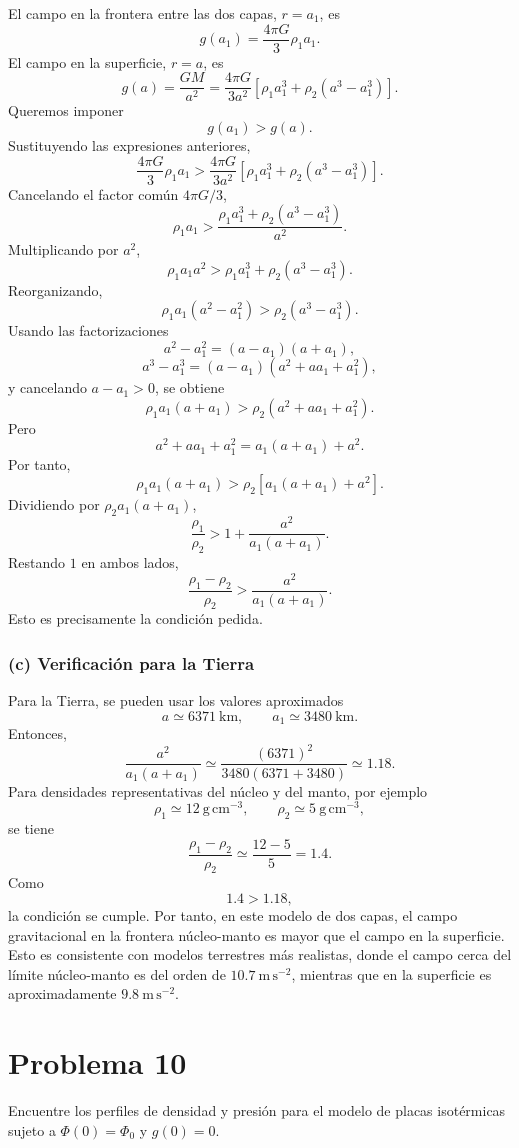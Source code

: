 \documentclass[a4paper]{article}
\begin{document}
El campo en la frontera entre las dos capas, $r=a_1$, es
$$
g(a_1)=\frac{4\pi G}{3}\rho_1 a_1.
$$
El campo en la superficie, $r=a$, es
$$
g(a)=\frac{GM}{a^2}
=
\frac{4\pi G}{3a^2}
\left[
\rho_1 a_1^3+\rho_2(a^3-a_1^3)
\right].
$$
Queremos imponer
$$
g(a_1)>g(a).
$$
Sustituyendo las expresiones anteriores,
$$
\frac{4\pi G}{3}\rho_1 a_1
>
\frac{4\pi G}{3a^2}
\left[
\rho_1 a_1^3+\rho_2(a^3-a_1^3)
\right].
$$
Cancelando el factor común $4\pi G/3$,
$$
\rho_1 a_1
>
\frac{\rho_1 a_1^3+\rho_2(a^3-a_1^3)}{a^2}.
$$
Multiplicando por $a^2$,
$$
\rho_1 a_1 a^2
>
\rho_1 a_1^3+\rho_2(a^3-a_1^3).
$$
Reorganizando,
$$
\rho_1 a_1(a^2-a_1^2)
>
\rho_2(a^3-a_1^3).
$$
Usando las factorizaciones
$$
a^2-a_1^2=(a-a_1)(a+a_1),
$$
$$
a^3-a_1^3=(a-a_1)(a^2+aa_1+a_1^2),
$$
y cancelando $a-a_1>0$, se obtiene
$$
\rho_1 a_1(a+a_1)
>
\rho_2(a^2+aa_1+a_1^2).
$$
Pero
$$
a^2+aa_1+a_1^2=a_1(a+a_1)+a^2.
$$
Por tanto,
$$
\rho_1 a_1(a+a_1)
>
\rho_2\left[a_1(a+a_1)+a^2\right].
$$
Dividiendo por $\rho_2 a_1(a+a_1)$,
$$
\frac{\rho_1}{\rho_2}
>
1+\frac{a^2}{a_1(a+a_1)}.
$$
Restando $1$ en ambos lados,
$$
\frac{\rho_1-\rho_2}{\rho_2}
>
\frac{a^2}{a_1(a+a_1)}.
$$
Esto es precisamente la condición pedida.

\subsubsection{(c) Verificación para la Tierra}

Para la Tierra, se pueden usar los valores aproximados
$$
a\simeq 6371\ \mathrm{km},
\qquad
a_1\simeq 3480\ \mathrm{km}.
$$
Entonces,
$$
\frac{a^2}{a_1(a+a_1)}
\simeq
\frac{(6371)^2}{3480(6371+3480)}
\simeq 1.18.
$$
Para densidades representativas del núcleo y del manto, por ejemplo
$$
\rho_1\simeq 12\ \mathrm{g\,cm^{-3}},
\qquad
\rho_2\simeq 5\ \mathrm{g\,cm^{-3}},
$$
se tiene
$$
\frac{\rho_1-\rho_2}{\rho_2}
\simeq
\frac{12-5}{5}=1.4.
$$
Como
$$
1.4>1.18,
$$
la condición se cumple. Por tanto, en este modelo de dos capas, el campo gravitacional en la frontera núcleo-manto es mayor que el campo en la superficie. Esto es consistente con modelos terrestres más realistas, donde el campo cerca del límite núcleo-manto es del orden de $10.7\ \mathrm{m\,s^{-2}}$, mientras que en la superficie es aproximadamente $9.8\ \mathrm{m\,s^{-2}}$.


\section{Problema 10}

Encuentre los perfiles de densidad y presión para el modelo de placas isotérmicas sujeto a $\Phi(0)=\Phi_0$ y $g(0)=0$.
\end{document}

